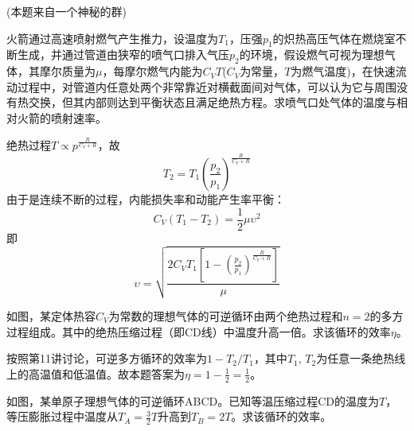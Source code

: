 \documentclass[CJK]{beamer}
\begin{document}
\begin{frame}
  \chtitle{\proid (\sthree)}
  \bch
  (本题来自一个神秘的群)

  \skipline
  
  火箭通过高速喷射燃气产生推力，设温度为$T_1$，压强$p_1$的炽热高压气体在燃烧室不断生成，并通过管道由狭窄的喷气口排入气压$p_2$的环境，假设燃气可视为理想气体，其摩尔质量为$\mu$，每摩尔燃气内能为$C_VT$($C_V$为常量，$T$为燃气温度)，在快速流动过程中，对管道内任意处两个非常靠近对横截面间对气体，可以认为它与周围没有热交换，但其内部则达到平衡状态且满足绝热方程。求喷气口处气体的温度与相对火箭的喷射速率。
  \ech
\end{frame}


\begin{frame}
  \bch
  绝热过程$T\propto p^{\frac{R}{C_V+R}}$，故
  $$T_2 = T_1\left(\frac{p_2}{p_1}\right)^{\frac{R}{C_V+R}}$$
  由于是连续不断的过程，内能损失率和动能产生率平衡：
  $$  C_V(T_1-T_2) =  \frac{1}{2}\mu\upsilon^2$$
  即
  $$\upsilon = \sqrt{\frac{2C_VT_1\left[1-\left(\frac{p_2}{p_1}\right)^{\frac{R}{C_V+R}}\right]}{\mu}}$$
  
  \ech
\end{frame}

\begin{frame}
  \chtitle{\proid (\stwo)}
  \bch

  如图，某定体热容$C_V$为常数的理想气体的可逆循环由两个绝热过程和$n=2$的多方过程组成。其中的绝热压缩过程（即CD线）中温度升高一倍。求该循环的效率$\eta$。
  \ech
\end{frame}

\begin{frame}
  \bch
  按照第11讲讨论，可逆多方循环的效率为$1-T_2/T_1$，其中$T_1$, $T_2$为任意一条绝热线上的高温值和低温值。故本题答案为$\eta = 1 - \frac{1}{2} = \frac{1}{2}$。
  \ech
\end{frame}

\begin{frame}
  \chtitle{\proid (\sthree)}
  \bch

  如图，某单原子理想气体的可逆循环ABCD。已知等温压缩过程CD的温度为$T$，等压膨胀过程中温度从$T_A=\frac{3}{2}T$升高到$T_B=2T$。求该循环的效率。
  
  \ech
\end{frame}
\end{document}
